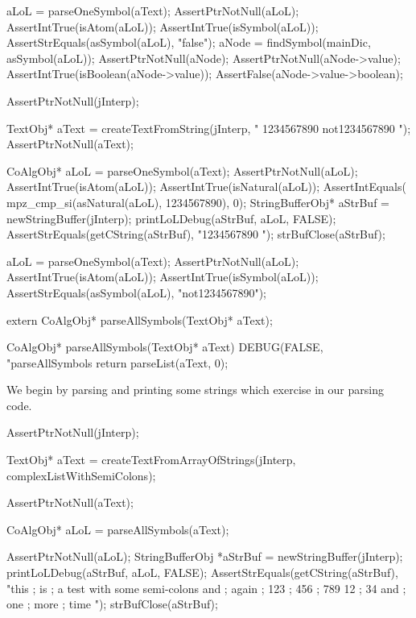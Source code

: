   aLoL = parseOneSymbol(aText);
  AssertPtrNotNull(aLoL);
  AssertIntTrue(isAtom(aLoL));
  AssertIntTrue(isSymbol(aLoL));
  AssertStrEquals(asSymbol(aLoL), "false");
  aNode = findSymbol(mainDic, asSymbol(aLoL));
  AssertPtrNotNull(aNode);
  AssertPtrNotNull(aNode->value);
  AssertIntTrue(isBoolean(aNode->value));
  AssertFalse(aNode->value->boolean);
\stopCTest
\skipTestCase

\startCTest
  AssertPtrNotNull(jInterp);

  TextObj* aText =
    createTextFromString(jInterp, " 1234567890 not1234567890 ");
  AssertPtrNotNull(aText);

  CoAlgObj* aLoL = parseOneSymbol(aText);
  AssertPtrNotNull(aLoL);
  AssertIntTrue(isAtom(aLoL));
  AssertIntTrue(isNatural(aLoL));
  AssertIntEquals( mpz_cmp_si(asNatural(aLoL), 1234567890), 0);
  StringBufferObj* aStrBuf = newStringBuffer(jInterp);
  printLoLDebug(aStrBuf, aLoL, FALSE);
  AssertStrEquals(getCString(aStrBuf), "1234567890 ");
  strBufClose(aStrBuf);

  aLoL = parseOneSymbol(aText);
  AssertPtrNotNull(aLoL);
  AssertIntTrue(isAtom(aLoL));
  AssertIntTrue(isSymbol(aLoL));
  AssertStrEquals(asSymbol(aLoL), "not1234567890");
\stopCTest
\stopTestCase
\stopTestSuite


\startCHeader
extern CoAlgObj* parseAllSymbols(TextObj* aText);
\stopCHeader

\startCCode
CoAlgObj* parseAllSymbols(TextObj* aText) {
  DEBUG(FALSE, "parseAllSymbols %
  return parseList(aText, 0);
}
\stopCCode

We begin by parsing and printing some strings which exercise  in our parsing code. 

\startCTest
  AssertPtrNotNull(jInterp);

  TextObj* aText =
    createTextFromArrayOfStrings(jInterp, complexListWithSemiColons);

  AssertPtrNotNull(aText);

  CoAlgObj* aLoL = parseAllSymbols(aText);

  AssertPtrNotNull(aLoL);
  StringBufferObj *aStrBuf = newStringBuffer(jInterp);
  printLoLDebug(aStrBuf, aLoL, FALSE);
  AssertStrEquals(getCString(aStrBuf),
    "this ; is ; a test with some semi-colons and ; again ; 123 ; 456 ; 789 12 ; 34 and ; one ; more ; time ");
  strBufClose(aStrBuf);
\stopCTest
\stopTestCase

